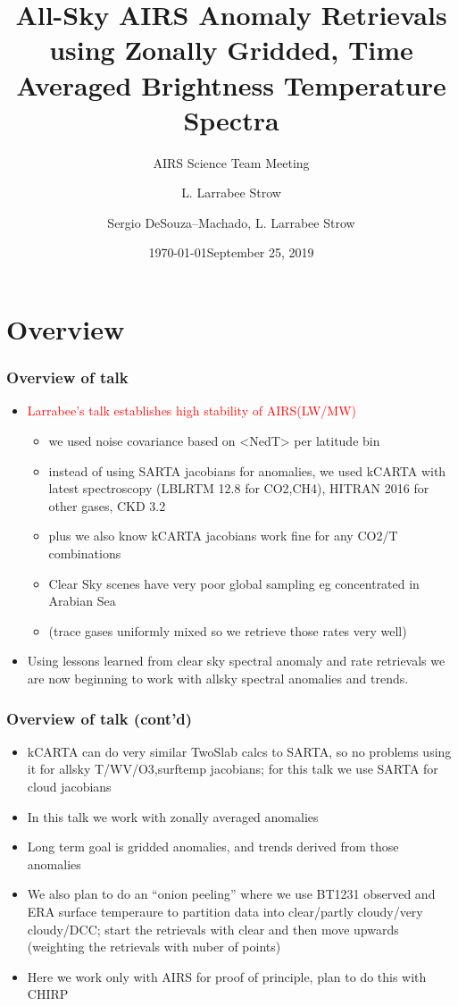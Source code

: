 \documentclass[10pt,t]{beamer}
\author{L. Larrabee Strow}
\date{\today}
\title{\large All-Sky AIRS Anomaly Retrievals \newline
  using Zonally Gridded, Time Averaged \newline
  Brightness Temperature Spectra}
\subtitle{\footnotesize{AIRS Science Team Meeting}}
\date{\vspace{0.1in}\footnotesize{September 25, 2019 \vfill}}
\author{Sergio DeSouza--Machado\inst{1,2}, L. Larrabee Strow\inst{1,2}}
\institute[UMBC]{\inst{1} UMBC Physics Dept. \and \inst{2}UMBC JCET}
\begin{document}
\maketitle
{}

\section{Overview}
\begin{frame}
  \frametitle{Overview of talk}
  \begin{itemize}
  \item \textcolor{red}{Larrabee's talk establishes high stability of AIRS(LW/MW)}
  \begin{itemize}
    \item we used noise covariance based on <NedT> per latitude bin 
    \item instead of using SARTA jacobians for anomalies, we used kCARTA with latest spectroscopy
    (LBLRTM 12.8 for CO2,CH4), HITRAN 2016 for other gases, CKD 3.2
    \item plus we also know kCARTA jacobians work fine for any CO2/T combinations
    \item Clear Sky scenes have very poor global sampling eg concentrated in Arabian Sea
    \item (trace gases uniformly mixed so we retrieve those rates very well)
  \end{itemize}
  \item Using lessons learned from clear sky spectral anomaly and rate retrievals 
     we are now beginning to work with  allsky spectral anomalies and trends.
  \end{itemize}
\end{frame}

\begin{frame}
  \frametitle{Overview of talk (cont'd)}
  \begin{itemize}
  \item kCARTA can do very similar TwoSlab calcs to SARTA, so no problems using it for allsky
        T/WV/O3,surftemp jacobians; for this talk we use SARTA for cloud jacobians
  \item In this talk we work with zonally averaged anomalies
  \item Long term goal is gridded anomalies, and trends derived from those anomalies
  \item We also plan to do an ``onion peeling'' where we use BT1231
    observed and ERA surface temperaure to partition data into
    clear/partly cloudy/very cloudy/DCC; start the retrievals with
    clear and then move upwards (weighting the retrievals with nuber
    of points)
  \item Here we work only with AIRS for proof of principle, plan to do this with CHIRP
  \end{itemize}
\end{frame}
\end{document}
